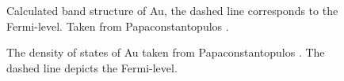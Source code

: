 \documentclass[a4paper,12pt,twoside]{article}
\begin{document}
    \begin{figure}[H]
		\caption{Calculated band structure of Au, the dashed line corresponds to the Fermi-level. Taken from Papaconstantopulos \cite{Papaconstantopoulos2015}.}
		    \label{bandgold}
	\end{figure}
    \begin{figure}[H]
		\caption{The density of states of Au taken from Papaconstantopulos \cite{Papaconstantopoulos2015}. The dashed line depicts the Fermi-level.}
		    \label{DOSgold}
	\end{figure}
\end{document}
